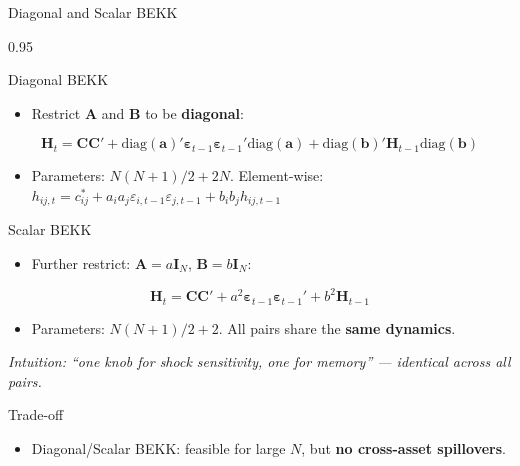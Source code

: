 \documentclass[9pt, aspectratio=169, t]{beamer}
\begin{document}
\begin{frame}{Diagonal and Scalar BEKK}
    \begin{cminipage}{0.95\textwidth}
    \vspace{-2mm}
    {\scriptsize
    \begin{block}{Diagonal BEKK}
        \begin{itemize}\setlength{\itemsep}{0pt}
            \item Restrict $\mathbf{A}$ and $\mathbf{B}$ to be \textbf{diagonal}:
        \end{itemize}
        \[
            \mathbf{H}_t = \mathbf{C}\mathbf{C}' + \text{diag}(\mathbf{a})'\boldsymbol{\varepsilon}_{t-1}\boldsymbol{\varepsilon}_{t-1}'\text{diag}(\mathbf{a}) + \text{diag}(\mathbf{b})'\mathbf{H}_{t-1}\text{diag}(\mathbf{b})
        \]
        \begin{itemize}\setlength{\itemsep}{0pt}
            \item Parameters: $N(N+1)/2 + 2N$. Element-wise: $h_{ij,t} = c_{ij}^* + a_i a_j \varepsilon_{i,t-1}\varepsilon_{j,t-1} + b_i b_j h_{ij,t-1}$
        \end{itemize}
    \end{block}
    \vspace{-1mm}
    \begin{block}{Scalar BEKK}
        \begin{itemize}\setlength{\itemsep}{0pt}
            \item Further restrict: $\mathbf{A} = a\mathbf{I}_N$, $\mathbf{B} = b\mathbf{I}_N$:
        \end{itemize}
        \vspace{-2mm}
        \[
            \mathbf{H}_t = \mathbf{C}\mathbf{C}' + a^2\boldsymbol{\varepsilon}_{t-1}\boldsymbol{\varepsilon}_{t-1}' + b^2\mathbf{H}_{t-1}
        \]
        \vspace{-2mm}
        \begin{itemize}\setlength{\itemsep}{0pt}
            \item Parameters: $N(N+1)/2 + 2$. All pairs share the \textbf{same dynamics}.
        \end{itemize}
        \textit{Intuition: ``one knob for shock sensitivity, one for memory'' --- identical across all pairs.}
    \end{block}
    \vspace{-2mm}
    \begin{alertblock}{Trade-off}
        \begin{itemize}\setlength{\itemsep}{0pt}
            \item Diagonal/Scalar BEKK: feasible for large $N$, but \textbf{no cross-asset spillovers}.
        \end{itemize}
    \end{alertblock}
    }
    \end{cminipage}
\end{frame}
\end{document}
